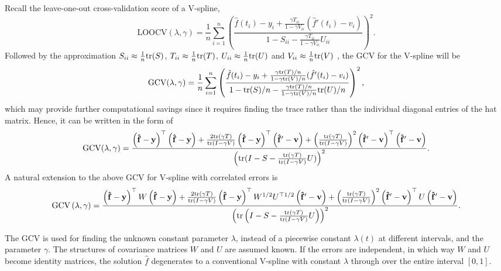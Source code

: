 Recall the leave-one-out cross-validation score of a V-spline, 
\begin{equation*}
\mbox{LOOCV}(\lambda,\gamma)=\frac{1}{n}\sum_{i=1}^{n}\left( \frac{\hat{f}(t_i)-y_i+\frac{\gamma T_{ii}}{1-\gamma V_{ii}}(\hat{f}'(t_i)-v_i)}{1-S_{ii}-\frac{\gamma T_{ii}}{1-\gamma V_{ii}}U_{ii}} \right)^2.
\end{equation*}
Followed by the approximation $S_{ii}\approx\frac{1}{n}\mathrm{tr}(S)$, $T_{ii}\approx\frac{1}{n}\mathrm{tr}(T)$, $U_{ii}\approx\frac{1}{n}\mathrm{tr}(U)$ and $V_{ii}\approx\frac{1}{n}\mathrm{tr}(V)$ \citep{syed2011review}, the GCV for the V-spline will be 
\begin{equation*}
\mbox{GCV}(\lambda,\gamma)=\frac{1}{n}\sum_{i=1}^{n}\left( \frac{\hat{f}(t_i)-y_i+ \frac{\gamma\mathrm{tr}(T)/n}{1-\gamma \mathrm{tr}(V)/n}(\hat{f}'(t_i)-v_i)}{1-\mathrm{tr}(S)/n-\frac{\gamma\mathrm{tr}(T)/n}{1-\gamma \mathrm{tr}(V)/n} \mathrm{tr}(U)/n} \right)^2,
\end{equation*}
which may provide further computational savings since it requires finding the trace rather than the individual diagonal entries of the hat matrix. Hence, it can be written in the form of \footnotesize
\begin{equation*}
\mbox{GCV}(\lambda,\gamma)=\frac{\left(\mathbf{\hat{f}}-\mathbf{y}\right)^\top \left(\mathbf{\hat{f}}-\mathbf{y}\right) + \frac{2\mathrm{tr}\left(\gamma T\right)}{\mathrm{tr}\left(I-\gamma V\right)}\left(\mathbf{\hat{f}}-\mathbf{y}\right)^\top \left(\mathbf{\hat{f}}'-\mathbf{v}\right) + \left( \frac{\mathrm{tr}(\gamma T)}{\mathrm{tr}(I-\gamma V)} \right)^2 \left(\mathbf{\hat{f}}'-\mathbf{v}\right)^\top \left(\mathbf{\hat{f}}'-\mathbf{v}\right)}{\left( \mathrm{tr}(I-S-\frac{\mathrm{tr}(\gamma T)}{\mathrm{tr}(I-\gamma V)}U) \right)^2}.
\end{equation*} \normalsize
A natural extension to the above GCV for V-spline with correlated errors is \scriptsize
\begin{equation}
\mbox{GCV}\left(\lambda,\gamma\right)=\frac{\left(\mathbf{\hat{f}}-\mathbf{y}\right)^\top W\left(\mathbf{\hat{f}}-\mathbf{y}\right)+\frac{2\mathrm{tr}\left(\gamma T\right)}{\mathrm{tr}\left(I-\gamma V\right)}\left(\mathbf{\hat{f}}-\mathbf{y}\right)^\top W^{1/2}U^{\top 1/2}\left(\mathbf{\hat{f}}'-\mathbf{v}\right) + \left( \frac{\mathrm{tr}\left(\gamma T\right)}{\mathrm{tr}\left(I-\gamma V\right)} \right)^2 \left(\mathbf{\hat{f}}'-\mathbf{v}\right)^\top U\left(\mathbf{\hat{f}}'-\mathbf{v}\right)}{\left( \mathrm{tr}\left(I-S-\frac{\mathrm{tr}\left(\gamma T\right)}{\mathrm{tr}\left(I-\gamma V\right)}U\right) \right)^2}.
\end{equation}
\normalsize


The GCV is used for finding the unknown constant parameter $\lambda$, instead of a piecewise constant $\lambda(t)$ at different intervals, and the parameter $\gamma$. The structures of covariance matrices $W$ and $U$ are assumed known. If the errors are independent, in which way $W$ and $U$ become identity matrices, the solution $\hat{f}$ degenerates to a conventional V-spline with constant $\lambda$ through over the entire interval $[0,1]$.  


